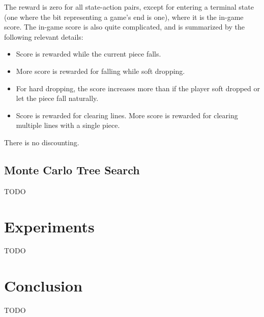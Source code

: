 \documentclass[letterpaper]{article} %
\begin{document}
The reward is zero for all state-action pairs, except for entering a terminal state (one where the bit representing a game's end is one), where it is the in-game score. The in-game score is also quite complicated, and is summarized by the following relevant details:

\begin{itemize}
  \item{
        Score is rewarded while the current piece falls.
        }
  \item{
        More score is rewarded for falling while soft dropping.
        }
  \item{
        For hard dropping, the score increases more than if the player soft dropped or let the piece fall naturally.
        }
  \item{
        Score is rewarded for clearing lines. More score is rewarded for clearing multiple lines with a single piece.
        }
\end{itemize}

There is no discounting.

\subsection{Monte Carlo Tree Search}

TODO

\section{Experiments}

TODO

\section{Conclusion}

TODO
\end{document}
